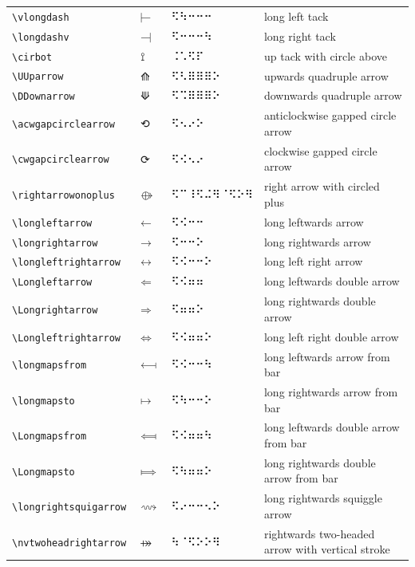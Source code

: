 \documentclass[oneside]{article}
\begin{document}
\begin{longtable}{llll}
\verb|\vlongdash| & $\vlongdash$ &   ⠫⠳⠒⠒⠒   & {long left tack} \\[2ex]
\verb|\longdashv| & $\longdashv$ &   ⠫⠒⠒⠒⠳   & {long right tack} \\[2ex]
\verb|\cirbot| & $\cirbot$ &   ⠨⠡⠫⠏   & {up tack with circle above} \\[2ex]
\verb|\UUparrow| & $\UUparrow$ &   ⠫⠣⠿⠿⠿⠕   & {upwards quadruple arrow} \\[2ex]
\verb|\DDownarrow| & $\DDownarrow$ &   ⠫⠩⠿⠿⠿⠕   & {downwards quadruple arrow} \\[2ex]
\verb|\acwgapcirclearrow| & $\acwgapcirclearrow$ &   ⠫⠢⠔⠕   & {anticlockwise gapped circle arrow} \\[2ex]
\verb|\cwgapcirclearrow| & $\cwgapcirclearrow$ &   ⠫⠪⠢⠔   & {clockwise gapped circle arrow} \\[2ex]
\verb|\rightarrowonoplus| & $\rightarrowonoplus$ &   ⠫⠉⠸⠫⠬⠻⠈⠫⠕⠻   & {right arrow with circled plus} \\[2ex]
\verb|\longleftarrow| & $\longleftarrow$ &   ⠫⠪⠒⠒   & {long leftwards arrow} \\[2ex]
\verb|\longrightarrow| & $\longrightarrow$ &   ⠫⠒⠒⠕   & {long rightwards arrow} \\[2ex]
\verb|\longleftrightarrow| & $\longleftrightarrow$ &   ⠫⠪⠒⠒⠕   & {long left right arrow} \\[2ex]
\verb|\Longleftarrow| & $\Longleftarrow$ &   ⠫⠪⠶⠶   & {long leftwards double arrow} \\[2ex]
\verb|\Longrightarrow| & $\Longrightarrow$ &   ⠫⠶⠶⠕   & {long rightwards double arrow} \\[2ex]
\verb|\Longleftrightarrow| & $\Longleftrightarrow$ &   ⠫⠪⠶⠶⠕   & {long left right double arrow} \\[2ex]
\verb|\longmapsfrom| & $\longmapsfrom$ &   ⠫⠪⠒⠒⠳   & {long leftwards arrow from bar} \\[2ex]
\verb|\longmapsto| & $\longmapsto$ &   ⠫⠳⠒⠒⠕   & {long rightwards arrow from bar} \\[2ex]
\verb|\Longmapsfrom| & $\Longmapsfrom$ &   ⠫⠪⠶⠶⠳   & {long leftwards double arrow from bar} \\[2ex]
\verb|\Longmapsto| & $\Longmapsto$ &   ⠫⠳⠶⠶⠕   & {long rightwards double arrow from bar} \\[2ex]
\verb|\longrightsquigarrow| & $\longrightsquigarrow$ &   ⠫⠔⠒⠒⠢⠕   & {long rightwards squiggle arrow} \\[2ex]
\verb|\nvtwoheadrightarrow| & $\nvtwoheadrightarrow$ &   ⠳⠈⠫⠕⠕⠻   & {rightwards two-headed arrow with vertical stroke} \\[2ex]

\end{longtable}
\end{document}
